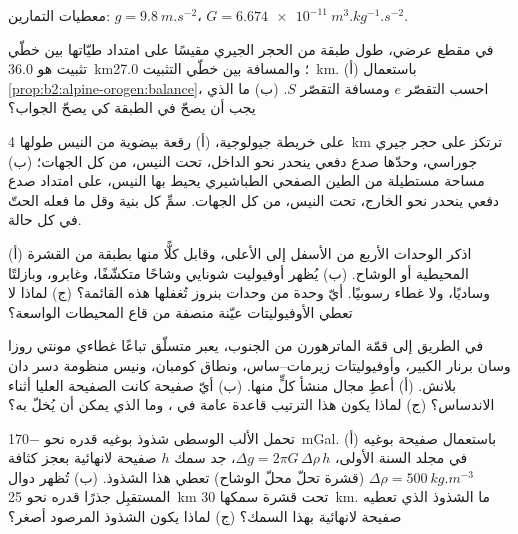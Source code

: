معطيات التمارين: $g = \qty{9.8}{m.s^{-2}}$،
$G = \qty{6.674e-11}{m^3.kg^{-1}.s^{-2}}$.

\begin{exercise}[$\star$]\label{exo:b2:alpine-orogen:1}
في مقطع عرضي، طول طبقة من الحجر الجيري مقيسًا على امتداد طيّاتها بين خطّي تثبيت هو
\qty{36.0}{km}؛ والمسافة بين خطّي التثبيت \qty{27.0}{km}. (أ) باستعمال
\cref{prop:b2:alpine-orogen:balance}، احسب التقصّر $e$ ومسافة التقصّر
$S$. (ب) ما الذي يجب أن يصحّ في الطبقة كي يصحّ الجواب؟
\end{exercise}

\begin{exercise}[$\star$]\label{exo:b2:alpine-orogen:2}
على خريطة جيولوجية، (أ) رقعة بيضوية من النيس طولها \qty{4}{km} ترتكز على حجر جيري
جوراسي، وحدّها صدع دفعي ينحدر نحو الداخل، تحت النيس، من كل الجهات؛ (ب)
مساحة مستطيلة من الطين الصفحي الطباشيري يحيط بها النيس، على امتداد صدع دفعي ينحدر
نحو الخارج، تحت النيس، من كل الجهات. سمِّ كل بنية وقل ما فعله الحتّ
في كل حالة.
\end{exercise}

\begin{exercise}[$\star$]\label{exo:b2:alpine-orogen:3}
(أ) اذكر الوحدات الأربع  من الأسفل إلى الأعلى، وقابل كلًّا منها
بطبقة من القشرة المحيطية أو الوشاح. (ب) يُظهر أوفيوليت شونايي وشاحًا متكشّفًا،
وغابرو، وبازلتًا وساديًا، ولا غطاء رسوبيًا. أيّ وحدة من وحدات بنروز تُغفلها هذه
القائمة؟ (ج) لماذا لا تعطي الأوفيوليتات عيّنة منصفة من قاع المحيطات
الواسعة؟
\end{exercise}

\begin{exercise}[$\star$]\label{exo:b2:alpine-orogen:4}
في الطريق إلى قمّة الماترهورن من الجنوب، يعبر متسلّق تباعًا غطاءي مونتي روزا
وسان برنار الكبير، وأوفيوليتات زيرمات--ساس، ونطاق كومبان، ونيس
منظومة دسر دان بلانش. (أ) أعطِ مجال منشأ كلٍّ منها. (ب) أيّ صفيحة كانت
الصفيحة العليا أثناء الاندساس؟ (ج) لماذا يكون هذا الترتيب قاعدة عامة في ،
وما الذي يمكن أن يُخلّ به؟
\end{exercise}

\begin{exercise}[$\star\star$]\label{exo:b2:alpine-orogen:5}
تحمل الألب الوسطى شذوذ بوغيه قدره نحو \qty{-170}{mGal}. (أ) باستعمال صفيحة بوغيه
في مجلد السنة الأولى، $\Delta g = 2\pi G\,\Delta\rho\,h$، جد سمك $h$
صفيحة لانهائية بعجز كثافة $\Delta\rho = \qty{500}{kg.m^{-3}}$ (قشرة تحلّ محلّ الوشاح)
تعطي هذا الشذوذ. (ب) تُظهر دوال المستقبِل جذرًا قدره نحو \qty{25}{km} تحت
قشرة سمكها \qty{30}{km}. ما الشذوذ الذي تعطيه صفيحة لانهائية بهذا السمك؟ (ج) لماذا يكون
الشذوذ المرصود أصغر؟
\end{exercise}

